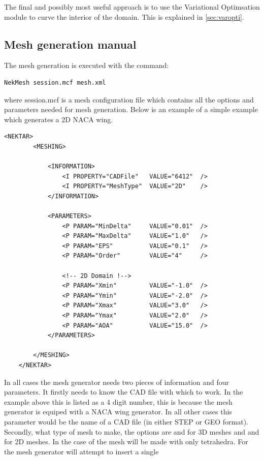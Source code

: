 The final and possibly most useful approach is to use the Variational
Optimsation module to curve the interior of the domain. This is explained in
\ref{sec:varopti}.

\subsection{Mesh generation manual}

The mesh generation is executed with the command:
\begin{lstlisting}[style=BashInputStyle]
    NekMesh session.mcf mesh.xml
\end{lstlisting}
where session.mcf is a mesh configuration file which contains all the options
and parameters needed for mesh generation. Below is an example of a simple
example which generates a 2D NACA wing.
\begin{lstlisting}[style=XmlStyle]
    <NEKTAR>
        <MESHING>

            <INFORMATION>
                <I PROPERTY="CADFile"   VALUE="6412"  />
                <I PROPERTY="MeshType"  VALUE="2D"    />
            </INFORMATION>

            <PARAMETERS>
                <P PARAM="MinDelta"     VALUE="0.01"  />
                <P PARAM="MaxDelta"     VALUE="1.0"   />
                <P PARAM="EPS"          VALUE="0.1"   />
                <P PARAM="Order"        VALUE="4"     />

                <!-- 2D Domain !-->
                <P PARAM="Xmin"         VALUE="-1.0"  />
                <P PARAM="Ymin"         VALUE="-2.0"  />
                <P PARAM="Xmax"         VALUE="3.0"   />
                <P PARAM="Ymax"         VALUE="2.0"   />
                <P PARAM="AOA"          VALUE="15.0"  />
            </PARAMETERS>

        </MESHING>
    </NEKTAR>
\end{lstlisting}
In all cases the mesh generator needs two pieces of information and four
parameters. It firstly needs to know the CAD file with which to work. In the
example above this is listed as a 4 digit number, this is because the mesh
generator is equiped with a NACA wing generator. In all other cases this
parameter would be the name of a CAD file (in either STEP or GEO format).
Secondly, what type of mesh to make, the options
are  and  for 3D meshes and  and 
for 2D meshes. In the case of  the mesh will be made with only
tetrahedra. For  the mesh generator will attempt to insert a single
